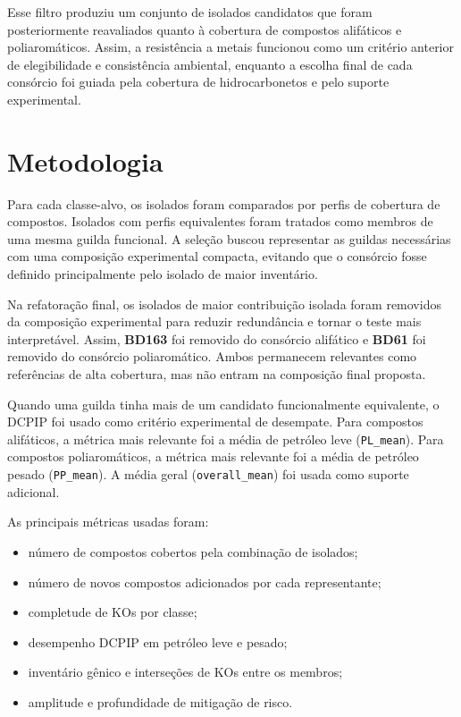 \documentclass[12pt,a4paper]{article}
\begin{document}
Esse filtro produziu um conjunto de isolados candidatos que foram posteriormente reavaliados quanto à cobertura de compostos alifáticos e poliaromáticos. Assim, a resistência a metais funcionou como um critério anterior de elegibilidade e consistência ambiental, enquanto a escolha final de cada consórcio foi guiada pela cobertura de hidrocarbonetos e pelo suporte experimental.

\section{Metodologia}

Para cada classe-alvo, os isolados foram comparados por perfis de cobertura de compostos. Isolados com perfis equivalentes foram tratados como membros de uma mesma guilda funcional. A seleção buscou representar as guildas necessárias com uma composição experimental compacta, evitando que o consórcio fosse definido principalmente pelo isolado de maior inventário.

Na refatoração final, os isolados de maior contribuição isolada foram removidos da composição experimental para reduzir redundância e tornar o teste mais interpretável. Assim, \textbf{BD163} foi removido do consórcio alifático e \textbf{BD61} foi removido do consórcio poliaromático. Ambos permanecem relevantes como referências de alta cobertura, mas não entram na composição final proposta.

Quando uma guilda tinha mais de um candidato funcionalmente equivalente, o DCPIP foi usado como critério experimental de desempate. Para compostos alifáticos, a métrica mais relevante foi a média de petróleo leve (\texttt{PL\_mean}). Para compostos poliaromáticos, a métrica mais relevante foi a média de petróleo pesado (\texttt{PP\_mean}). A média geral (\texttt{overall\_mean}) foi usada como suporte adicional.

As principais métricas usadas foram:

\begin{itemize}
    \item número de compostos cobertos pela combinação de isolados;
    \item número de novos compostos adicionados por cada representante;
    \item completude de KOs por classe;
    \item desempenho DCPIP em petróleo leve e pesado;
    \item inventário gênico e interseções de KOs entre os membros;
    \item amplitude e profundidade de mitigação de risco.
\end{itemize}
\end{document}
